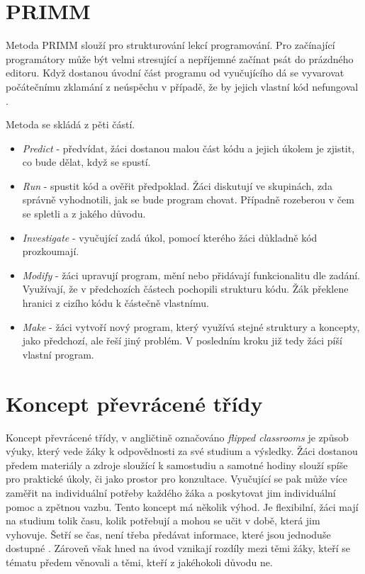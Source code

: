 \documentclass[
  digital,     %
  oneside,     %
  nosansbold,  %
  colorbold, %
  lof,         %
  nolot,         %
]{fithesis4}
\begin{document}
\section{PRIMM}
Metoda PRIMM slouží pro strukturování lekcí programování. Pro začínající programátory může být velmi stresující a nepříjemné začínat psát do prázdného editoru. Když dostanou úvodní část programu od vyučujícího dá se vyvarovat počátečnímu zklamání z neúspěchu v případě, že by jejich vlastní kód nefungoval \cite{hw}.

Metoda se skládá z pěti částí. 
\begin{itemize}
\item \textit{Predict} - předvídat, žáci dostanou malou část kódu a jejich úkolem je zjistit, co bude dělat, když se spustí. 
\item \textit{Run} - spustit kód a ověřit předpoklad. Žáci diskutují ve skupinách, zda správně vyhodnotili, jak se bude program chovat. Případně rozeberou v čem se spletli a z jakého důvodu. 
\item \textit{Investigate} - vyučující zadá úkol, pomocí kterého žáci důkladně kód prozkoumají. 
\item \textit{Modify} - žáci upravují program, mění nebo přidávají funkcionalitu dle zadání. Využívají, že v předchozích částech pochopili strukturu kódu. Žák překlene hranici z cizího kódu k částečně vlastnímu. 
\item \textit{Make} - žáci vytvoří nový program, který využívá stejné struktury a koncepty, jako předchozí, ale řeší jiný problém. V posledním kroku již tedy žáci píší vlastní program.
\end{itemize}

\section{Koncept převrácené třídy} %
Koncept převrácené třídy, v angličtině označováno \textit{flipped classrooms} je způsob výuky, který vede žáky k odpovědnosti za své studium a výsledky. 
Žáci dostanou předem materiály a zdroje sloužící k samostudiu a samotné hodiny slouží spíše pro praktické úkoly, či jako prostor pro konzultace. Vyučující se pak může více zaměřit na individuální potřeby každého žáka a poskytovat jim individuální pomoc a zpětnou vazbu.
Tento koncept má několik výhod. Je flexibilní, žáci mají na studium tolik času, kolik potřebují a mohou se učit v době, která jim vyhovuje. Šetří se čas, není třeba předávat informace, které jsou jednoduše dostupné \cite{mazur09}. Zároveň však hned na úvod vznikají rozdíly mezi těmi žáky, kteří se tématu předem věnovali a těmi, kteří z jakéhokoli důvodu ne.
\end{document}
